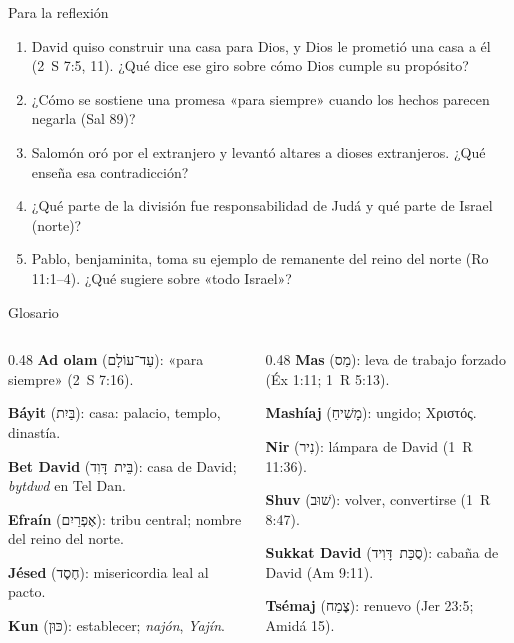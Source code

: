 \documentclass[hyperref={bookmarks=false},aspectratio=169]{beamer}
\newcommand{\heb}[1]{\mbox{\foreignlanguage{hebrew}{#1}}}
\newcommand{\grc}[1]{\foreignlanguage{ancientgreek}{#1}}
\begin{document}
\begin{frame}{Para la reflexión}
\small
\begin{enumerate}\setlength{\itemsep}{6pt}
\item David quiso construir una casa para Dios, y Dios le prometió una casa a él (2~S 7:5, 11). ¿Qué dice ese giro sobre cómo Dios cumple su propósito?
\item ¿Cómo se sostiene una promesa «para siempre» cuando los hechos parecen negarla (Sal 89)?
\item Salomón oró por el extranjero y levantó altares a dioses extranjeros. ¿Qué enseña esa contradicción?
\item ¿Qué parte de la división fue responsabilidad de Judá y qué parte de Israel (norte)?
\item Pablo, benjaminita, toma su ejemplo de remanente del reino del norte (Ro 11:1--4). ¿Qué sugiere sobre «todo Israel»?
\end{enumerate}
\end{frame}

\begin{frame}{Glosario}
\begin{columns}[T,onlytextwidth]
\begin{column}{0.48\textwidth}\small
\textbf{Ad olam} (\heb{עַד־עוֹלָם}): «para siempre» (2~S 7:16).\par\smallskip
\textbf{Báyit} (\heb{בַּיִת}): casa: palacio, templo, dinastía.\par\smallskip
\textbf{Bet David} (\heb{בֵּית דָּוִד}): casa de David; \emph{bytdwd} en Tel Dan.\par\smallskip
\textbf{Efraín} (\heb{אֶפְרַיִם}): tribu central; nombre del reino del norte.\par\smallskip
\textbf{Jésed} (\heb{חֶסֶד}): misericordia leal al pacto.\par\smallskip
\textbf{Kun} (\heb{כּוּן}): establecer; \emph{najón}, \emph{Yajín}.
\end{column}
\begin{column}{0.48\textwidth}\small
\textbf{Mas} (\heb{מַס}): leva de trabajo forzado (Éx 1:11; 1~R 5:13).\par\smallskip
\textbf{Mashíaj} (\heb{מָשִׁיחַ}): ungido; \grc{Χριστός}.\par\smallskip
\textbf{Nir} (\heb{נִיר}): lámpara de David (1~R 11:36).\par\smallskip
\textbf{Shuv} (\heb{שׁוּב}): volver, convertirse (1~R 8:47).\par\smallskip
\textbf{Sukkat David} (\heb{סֻכַּת דָּוִיד}): cabaña de David (Am 9:11).\par\smallskip
\textbf{Tsémaj} (\heb{צֶמַח}): renuevo (Jer 23:5; Amidá 15).
\end{column}
\end{columns}
\end{frame}
\end{document}

